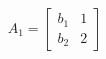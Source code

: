 \documentclass[preview]{standalone}
\begin{document}
\begin{align*}
A_1 = \begin{bmatrix} b_1 & 1 \\ b_2 & 2 \end{bmatrix}
\end{align*}
\end{document}
